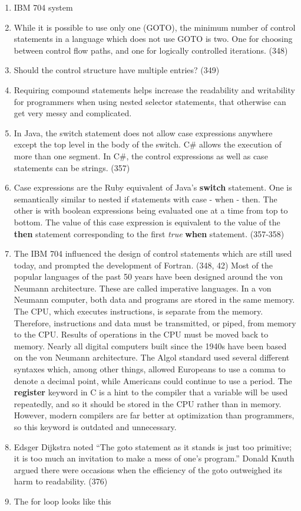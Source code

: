 \begin{answer}
\begin{enumerate}
\item IBM 704 system
\item While it is possible to use only one (GOTO), the minimum number
  of control statements in a language which does not use GOTO is
  two. One for choosing between control flow paths, and one for
  logically controlled iterations. (348)
\item Should the control structure have multiple entries? (349)
\item Requiring compound statements helps increase the readability and
  writability for programmers when using nested selector statements,
  that otherwise can get very messy and complicated.
\item In Java, the switch statement does not allow case expressions
  anywhere except the top level in the body of the switch.  C\# allows
  the execution of more than one segment. In C\#, the control
  expressions as well as case statements can be strings. (357)
\item Case expressions are the Ruby equivalent of Java's
  \textbf{switch} statement. One is semantically similar to nested if
  statements with case - when - then. The other is with boolean
  expressions being evaluated one at a time from top to bottom. The
  value of this case expression is equivalent to the value of the
  \textbf{then} statement corresponding to the first \textit{true}
  \textbf{when} statement. (357-358)
\item The IBM 704 influenced the design of control statements which
  are still used today, and prompted the development of Fortran. (348,
  42) Most of the popular languages of the past 50 years have been
  designed around the von Neumann architecture. These are called
  imperative languages. In a von Neumann computer, both data and
  programs are stored in the same memory. The CPU, which executes
  instructions, is separate from the memory. Therefore, instructions
  and data must be transmitted, or piped, from memory to the
  CPU. Results of operations in the CPU must be moved back to
  memory. Nearly all digital computers built since the 1940s have been
  based on the von Neumann architecture.  The Algol standard used
  several different syntaxes which, among other things, allowed
  Europeans to use a comma to denote a decimal point, while Americans
  could continue to use a period.  The \textbf{register} keyword in C
  is a hint to the compiler that a variable will be used repeatedly,
  and so it should be stored in the CPU rather than in
  memory. However, modern compilers are far better at optimization
  than programmers, so this keyword is outdated and unnecessary.
\item Edsger Dijkstra noted “The goto statement as it stands is just
  too primitive; it is too much an invitation to make a mess of one’s
  program.” Donald Knuth argued there were occasions when the
  efficiency of the goto outweighed its harm to readability. (376)
\item The for loop looks like this


\end{enumerate}
\end{answer}

